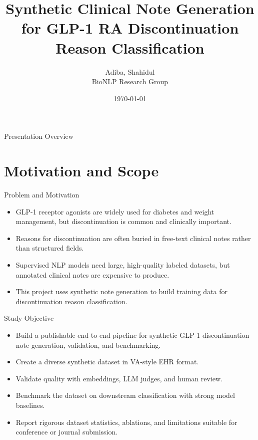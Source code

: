 \documentclass[aspectratio=169]{beamer}
\title{Synthetic Clinical Note Generation for GLP-1 RA Discontinuation Reason Classification}
\author{Adiba, Shahidul \\ BioNLP Research Group}
\date{\today}
\begin{document}
\begin{frame}
    \titlepage
\end{frame}

\begin{frame}{Presentation Overview}
    \tableofcontents
\end{frame}

\section{Motivation and Scope}

\begin{frame}{Problem and Motivation}
    \begin{itemize}
        \item GLP-1 receptor agonists are widely used for diabetes and weight management, but discontinuation is common and clinically important.
        \item Reasons for discontinuation are often buried in free-text clinical notes rather than structured fields.
        \item Supervised NLP models need large, high-quality labeled datasets, but annotated clinical notes are expensive to produce.
        \item This project uses synthetic note generation to build training data for discontinuation reason classification.
    \end{itemize}
\end{frame}

\begin{frame}{Study Objective}
    \begin{itemize}
        \item Build a publishable end-to-end pipeline for synthetic GLP-1 discontinuation note generation, validation, and benchmarking.
        \item Create a diverse synthetic dataset in VA-style EHR format.
        \item Validate quality with embeddings, LLM judges, and human review.
        \item Benchmark the dataset on downstream classification with strong model baselines.
        \item Report rigorous dataset statistics, ablations, and limitations suitable for conference or journal submission.
    \end{itemize}
\end{frame}
\end{document}
